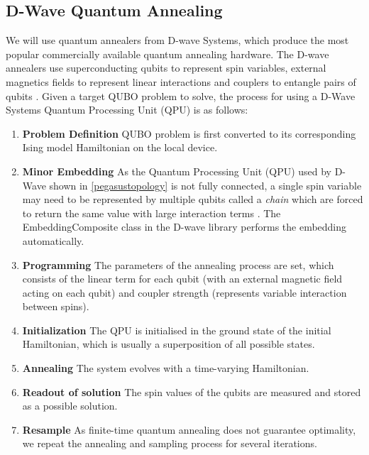\subsection{D-Wave Quantum Annealing}
We will use quantum annealers from D-wave Systems, which produce the most popular commercially available quantum annealing hardware. The D-wave annealers use superconducting qubits to represent spin variables, external magnetics fields to represent linear interactions and couplers to entangle pairs of qubits \cite{b14}. Given a target QUBO problem to solve, the process for using a D-Wave Systems Quantum Processing Unit (QPU) is as follows:
\begin{enumerate}
    \item \textbf{Problem Definition} QUBO problem is first converted to its corresponding Ising model Hamiltonian on the local device.
    \item \textbf{Minor Embedding} As the Quantum Processing Unit (QPU) used by D-Wave shown in \autoref{pegasustopology} is not fully connected, a single spin variable may need to be represented by multiple qubits called a \textit{chain} which are forced to return the same value with large interaction terms \cite{b16}. The EmbeddingComposite class in the D-wave library performs the embedding automatically.
    \item \textbf{Programming} The parameters of the annealing process are set, which consists of the linear term for each qubit (with an external magnetic field acting on each qubit) and coupler strength (represents variable interaction between spins).
    \item \textbf{Initialization} The QPU is initialised in the ground state of the initial Hamiltonian, which is usually a superposition of all possible states.
    \item \textbf{Annealing} The system evolves with a time-varying Hamiltonian.
    \item \textbf{Readout of solution} The spin values of the qubits are measured and stored as a possible solution.
    \item \textbf{Resample} As finite-time quantum annealing does not guarantee optimality, we repeat the annealing and sampling process for several iterations.
\end{enumerate}
